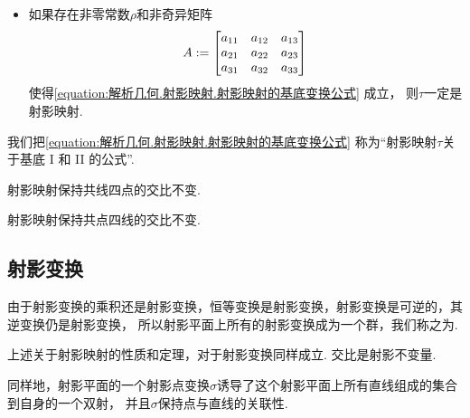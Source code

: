 \begin{theorem}
\begin{itemize}
	\item
	如果存在非零常数\(\rho\)和非奇异矩阵\begin{equation*}
		A
		:=
		\begin{bmatrix}
			a_{11} & a_{12} & a_{13} \\
			a_{21} & a_{22} & a_{23} \\
			a_{31} & a_{32} & a_{33}
		\end{bmatrix}
	\end{equation*}
	使得\cref{equation:解析几何.射影映射.射影映射的基底变换公式} 成立，
	则\(\tau\)一定是射影映射.
\end{itemize}
\end{theorem}

我们把\cref{equation:解析几何.射影映射.射影映射的基底变换公式}
称为“射影映射\(\tau\)关于基底 I 和 II 的公式”.

\begin{property}
射影映射保持共线四点的交比不变.
\end{property}

\begin{property}
射影映射保持共点四线的交比不变.
\end{property}

\subsection{射影变换}
由于射影变换的乘积还是射影变换，恒等变换是射影变换，射影变换是可逆的，其逆变换仍是射影变换，
所以射影平面上所有的射影变换成为一个群，我们称之为.

上述关于射影映射的性质和定理，对于射影变换同样成立.
交比是射影不变量.

同样地，射影平面的一个射影点变换\(\sigma\)诱导了这个射影平面上所有直线组成的集合到自身的一个双射，
并且\(\sigma\)保持点与直线的关联性.

